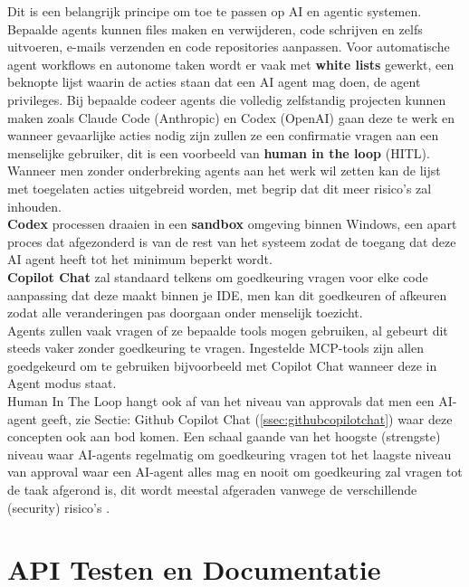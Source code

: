 Dit is een belangrijk principe om toe te passen op AI en agentic systemen. Bepaalde agents kunnen files maken en verwijderen, code schrijven en zelfs uitvoeren, e-mails verzenden en code repositories aanpassen. Voor automatische agent workflows en autonome taken wordt er vaak met \textbf{white lists} gewerkt, een beknopte lijst waarin de acties staan dat een AI agent mag doen, de agent privileges. Bij bepaalde codeer agents die volledig zelfstandig projecten kunnen maken zoals Claude Code (Anthropic) en Codex (OpenAI) gaan deze te werk en wanneer gevaarlijke acties nodig zijn zullen ze een confirmatie vragen aan een menselijke gebruiker, dit is een voorbeeld van \textbf{human in the loop} (HITL). Wanneer men zonder onderbreking agents aan het werk wil zetten kan de lijst met toegelaten acties uitgebreid worden, met begrip dat dit meer risico's zal inhouden. \\

\textbf{Codex} processen draaien in een \textbf{sandbox} omgeving binnen Windows, een apart proces dat afgezonderd is van de rest van het systeem zodat de toegang dat deze AI agent heeft tot het minimum beperkt wordt. \\

\textbf{Copilot Chat} zal standaard telkens om goedkeuring vragen voor elke code aanpassing dat deze maakt binnen je IDE, men kan dit goedkeuren of afkeuren zodat alle veranderingen pas doorgaan onder menselijk toezicht. \\

Agents zullen vaak vragen of ze bepaalde tools mogen gebruiken, al gebeurt dit steeds vaker zonder goedkeuring te vragen. Ingestelde MCP-tools zijn allen goedgekeurd om te gebruiken bijvoorbeeld met Copilot Chat wanneer deze in Agent modus staat. \\

Human In The Loop hangt ook af van het niveau van approvals dat men een AI-agent geeft, zie Sectie: Github Copilot Chat  (\ref{ssec:githubcopilotchat}) waar deze concepten ook aan bod komen. Een schaal gaande van het hoogste (strengste) niveau waar AI-agents regelmatig om goedkeuring vragen tot het laagste niveau van approval waar een AI-agent alles mag en nooit om goedkeuring zal vragen tot de taak afgerond is, dit wordt meestal afgeraden vanwege de verschillende (security) risico's \autocite{mitchell2025}.

\section{API Testen en Documentatie}
\label{sec:apitestenendocumentatie}

